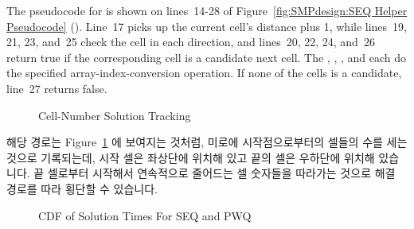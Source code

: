 The pseudocode for  is shown on lines~14-28
of Figure~\ref{fig:SMPdesign:SEQ Helper Pseudocode}
().
Line~17 picks up the current cell's distance plus 1,
while lines~19, 21, 23, and~25
check the cell in each direction, and lines~20, 22, 24, and~26
return true if the corresponding cell is a candidate next cell.
The , , , and 
each do the specified array-index-conversion operation.
If none of the cells is a candidate, line~27 returns false.
\fi

\begin{figure}[tb]
\begin{center}
\end{center}
\caption{Cell-Number Solution Tracking}
\label{fig:SMPdesign:Cell-Number Solution Tracking}
\end{figure}

해당 경로는 Figure~\ref{fig:SMPdesign:Cell-Number Solution Tracking} 에
보여지는 것처럼, 미로에 시작점으로부터의 셀들의 수를 세는 것으로 기록되는데,
시작 셀은 좌상단에 위치해 있고 끝의 셀은 우하단에 위치해 있습니다.
끝 셀로부터 시작해서 연속적으로 줄어드는 셀 숫자들을 따라가는 것으로 해결
경로를 따라 횡단할 수 있습니다.

\begin{figure}[tb]
\begin{center}
\end{center}
\caption{CDF of Solution Times For SEQ and PWQ}
\label{fig:SMPdesign:CDF of Solution Times For SEQ and PWQ}
\end{figure}

